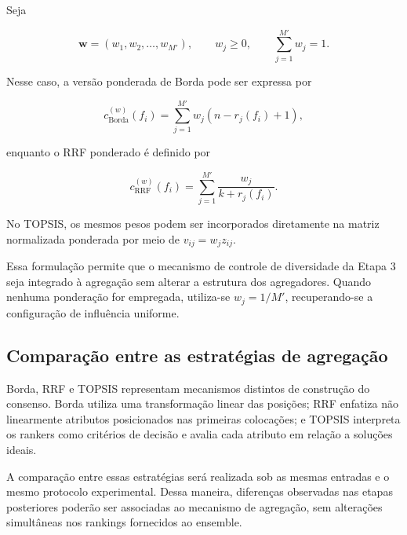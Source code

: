 Seja

\begin{equation}
    \mathbf{w}
    =
    (w_1,w_2,\ldots,w_{M'}),
    \qquad
    w_j\geq0,
    \qquad
    \sum_{j=1}^{M'}w_j=1.
    \label{eq:pesos-rankers-ac-efs}
\end{equation}

Nesse caso, a versão ponderada de Borda pode ser expressa por

\begin{equation}
    c_{\mathrm{Borda}}^{(w)}(f_i)
    =
    \sum_{j=1}^{M'}
    w_j
    \left(n-r_j(f_i)+1\right),
    \label{eq:borda-ponderado-ac-efs}
\end{equation}

enquanto o RRF ponderado é definido por

\begin{equation}
    c_{\mathrm{RRF}}^{(w)}(f_i)
    =
    \sum_{j=1}^{M'}
    \frac{w_j}{k+r_j(f_i)}.
    \label{eq:rrf-ponderado-ac-efs}
\end{equation}

No TOPSIS, os mesmos pesos podem ser incorporados diretamente na matriz
normalizada ponderada por meio de $v_{ij}=w_jz_{ij}$.

Essa formulação permite que o mecanismo de controle de diversidade da Etapa 3
seja integrado à agregação sem alterar a estrutura dos agregadores. Quando
nenhuma ponderação for empregada, utiliza-se $w_j=1/M'$, recuperando-se a
configuração de influência uniforme.


\subsection{Comparação entre as estratégias de agregação}
\label{subsec:ac-efs-comparacao-agregadores}

Borda, RRF e TOPSIS representam mecanismos distintos de construção do
consenso. Borda utiliza uma transformação linear das posições; RRF enfatiza
não linearmente atributos posicionados nas primeiras colocações; e TOPSIS
interpreta os rankers como critérios de decisão e avalia cada atributo em
relação a soluções ideais.

A comparação entre essas estratégias será realizada sob as mesmas entradas e
o mesmo protocolo experimental. Dessa maneira, diferenças observadas nas
etapas posteriores poderão ser associadas ao mecanismo de agregação, sem
alterações simultâneas nos rankings fornecidos ao ensemble.


